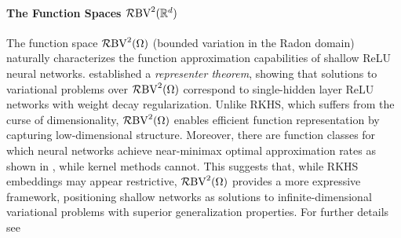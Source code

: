 \paragraph{The Function Spaces $\mathcal{R}\mathrm{BV}^2({\mathbb{R}^d})$} The function space \(\mathcal{R}\mathrm{BV}^2({\Omega})\) (bounded variation in the Radon domain) naturally characterizes the function approximation capabilities of shallow ReLU neural networks. \citet{Parhi2020BanachSR} established a \textit{representer theorem}, showing that solutions to variational problems over \(\mathcal{R}\mathrm{BV}^2({\Omega})\) correspond to single-hidden layer ReLU networks with weight decay regularization. Unlike RKHS, which suffers from the curse of dimensionality, \(\mathcal{R}\mathrm{BV}^2({\Omega})\) enables efficient function representation by capturing low-dimensional structure. %
Moreover, there are function classes for which neural networks achieve near-minimax optimal approximation rates as shown in \citet{near_mini}, while kernel methods cannot. This suggests that, while RKHS embeddings may appear restrictive, \(\mathcal{R}\mathrm{BV}^2({\Omega})\) provides a more expressive framework, positioning shallow networks as solutions to infinite-dimensional variational problems with superior generalization properties. %
For further details see \citep{Parhi2020BanachSR,Parhi2021WhatKO,Parhi2023FunctionSpaceOO}


